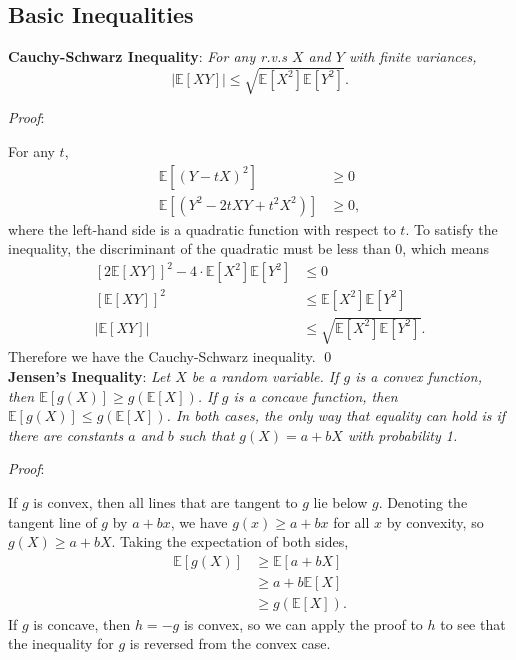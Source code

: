 \documentclass{progartcn}
\begin{document}
	\subsection{Basic Inequalities}

		\textbf{Cauchy-Schwarz Inequality}: \textit{For any r.v.s $X$ and $Y$ with finite variances,}
		\[|\mathbb{E}[XY]|\le \sqrt{\mathbb{E}[X^2]\mathbb{E}[Y^2]}.\]

			\textit{Proof}:

			For any $t$,
			\[\begin{split}
			\mathbb{E}[(Y-tX)^2]&\ge 0\\
			\mathbb{E}[(Y^2-2tXY+t^2X^2)]&\ge 0,
			\end{split}
			\]
			where the left-hand side is a quadratic function with respect to $t$. To satisfy the inequality, the discriminant of the quadratic must be less than 0, which means
			\[\begin{split}
			[2\mathbb{E}[XY]]^2-4\cdot \mathbb{E}[X^2]\mathbb{E}[Y^2]&\le 0\\
			[\mathbb{E}[XY]]^2&\le \mathbb{E}[X^2]\mathbb{E}[Y^2]\\
			|\mathbb{E}[XY]|&\le \sqrt{\mathbb{E}[X^2]\mathbb{E}[Y^2]}.
			\end{split}
			\]
			Therefore we have the Cauchy-Schwarz inequality.
			\qed\\

		\textbf{Jensen's Inequality}: \textit{Let $X$ be a random variable. If $g$ is a convex function, then $\mathbb{E}[g(X)]\ge g(\mathbb{E}[X])$. If $g$ is a concave function, then $\mathbb{E}[g(X)]\le g(\mathbb{E}[X])$. In both cases, the only way that equality can hold is if there are constants $a$ and $b$ such that $g(X)=a+bX$ with probability 1.}

			\textit{Proof}:

			If $g$ is convex, then all lines that are tangent to $g$ lie below $g$. Denoting the tangent line of $g$ by $a+bx$, we have $g(x)\ge a+bx$ for all $x$ by convexity, so $g(X)\ge a+bX$. Taking the expectation of both sides,
			\[\begin{split}
			\mathbb{E}[g(X)]&\ge \mathbb{E}[a+bX]\\
			&\ge a+b\mathbb{E}[X]\\
			&\ge g(\mathbb{E}[X]).
			\end{split}
			\]
			If $g$ is concave, then $h=-g$ is convex, so we can apply the proof to $h$ to see that the inequality for $g$ is reversed from the convex case.
\end{document}
